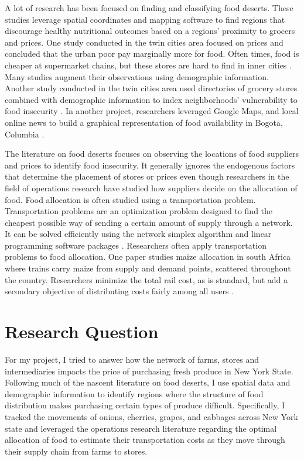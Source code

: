 \documentclass{report}
\begin{document}
A lot of research has been focused on finding and classifying food deserts. These studies leverage spatial coordinates and mapping software to find regions that discourage healthy nutritional outcomes based on a regions' proximity to grocers and prices. One study conducted in the twin cities area focused on prices and concluded that the urban poor pay marginally more for food. Often times, food is cheaper at supermarket chains, but these stores are hard to find in inner cities \cite{Chung}. Many studies augment their observations using demographic information. Another study conducted in the twin cities area used directories of grocery stores combined with demographic information to index neighborhoods' vulnerability to food insecurity \cite{Larson}. In another project, researchers leveraged Google Maps, and local online news to build a graphical representation of food availability in Bogota, Columbia \cite{Hwang}. 

The literature on food deserts focuses on observing the locations of food suppliers and prices to identify food insecurity. It generally ignores the endogenous factors that determine the placement of stores or prices even though researchers in the field of operations research have studied how suppliers decide on the allocation of food. Food allocation is often studied using a transportation problem. Transportation problems are an optimization problem designed to find the cheapest possible way of sending a certain amount of supply through a network. It can be solved efficiently using the network simplex algorithm and linear programming software packages \cite{Cook}. Researchers often apply transportation problems to food allocation. One paper studies maize allocation in south Africa where trains carry maize from supply and demand points, scattered throughout the country. Researchers minimize the total rail cost, as is standard, but add a secondary objective of distributing costs fairly among all users \cite{Stewart}.

\section{Research Question} 

For my project, I tried to answer how the network of farms, stores and intermediaries impacts the price of purchasing fresh produce in New York State. Following much of the nascent literature on food deserts, I use spatial data and demographic information to identify regions where the structure of food distribution makes purchasing certain types of produce difficult. Specifically, I tracked the movements of onions, cherries, grapes, and cabbages across New York state and leveraged the operations research literature regarding the optimal allocation of food to estimate their transportation costs as they move through their supply chain from farms to stores. 
\end{document}
